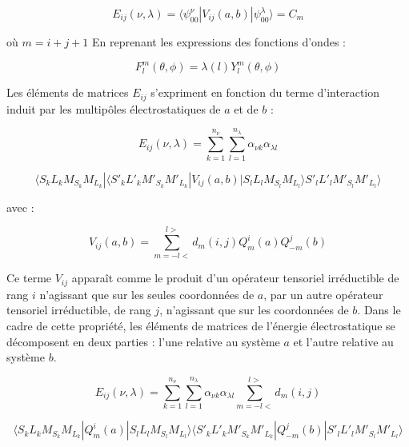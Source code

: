 	\begin{equation}
	E_{ij}(\nu, \lambda) = \langle \psi_{00}^{\nu}|V_{ij}(a,b)|\psi_{00}^{\lambda} \rangle = C_{m}
	\end{equation}
	
	où $m= i+j+1$ 
	En reprenant les expressions des fonctions d'ondes :
	
	\begin{equation}
	F_{l}^{m} (\theta,\phi) = \lambda (l)Y_{l}^{m} (\theta,\phi)
	\end{equation}
	
	Les éléments de matrices $E_{ij}$ s'expriment en fonction du terme d'interaction induit par les multipôles électrostatiques de $a$ et de $b$ : 
	
	\begin{equation*}
	E_{ij} (\nu , \lambda) = \sum_{k=1}^{n_{\nu}} \sum_{l=1}^{n_{\lambda}} \alpha_{\nu k} \alpha_{\lambda l}
	\end{equation*}
	
	\begin{equation}
	\langle S_{k}L_{k}M_{S_{k}}M_{L_{k}}|\langle S'_{k}L'_{k}M'_{S_{k}}M'_{L_{k}}| V_{ij}(a,b)| S_{l}L_{l}M_{S_{l}} M_{L_{l}} \rangle S'_{l}L'_{l}M'_{S_{l}}M'_{L_{l}} \rangle
	\end{equation}
	
	avec : 
	
	\begin{equation}
	V_{ij}(a,b) = \sum_{m=-l<}^{l>} d_{m}(i,j) Q_{m}^{i}(a) Q_{-m}^{j}(b) 
	\end{equation}
	
	Ce terme $V_{ij}$ apparaît comme le produit d'un opérateur tensoriel irréductible de rang $i$ n'agissant que sur les seules coordonnées de $a$, par un autre opérateur tensoriel irréductible, de rang $j$, n'agissant que sur les coordonnées de $b$. Dans le cadre de cette propriété, les éléments de matrices de l'énergie électrostatique se décomposent en deux parties : l'une relative au système $a$ et l'autre relative au système $b$. 
	
	\begin{equation*}
	E_{ij}(\nu , \lambda)= \sum_{k=1}^{n_{\nu}} \sum_{l=1}^{n_{\lambda}} \alpha_{\nu k} \alpha_{\lambda l} \sum_{m=-l<}^{l>} d_{m}(i,j)
	\end{equation*}
	
	\begin{equation}
	\langle S_{k}L_{k}M_{S_{k}}M_{L_{k}}| Q_{m}^{i} (a)| S_{l}L_{l}M_{S_{l}}M_{L_{l}}\rangle \langle S'_{k}L'_{k}M'_{S_{k}}M'_{L_{k}}| Q_{-m}^{j} (b) | S'_{l}L'_{l}M'_{S_{l}}M'_{L_{l}}\rangle
	\end{equation}
	
